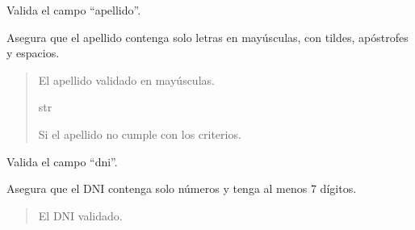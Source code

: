 \documentclass[letterpaper,10pt,spanish]{sphinxmanual}
\begin{document}
\begin{fulllineitems}
\begin{fulllineitems}
\pysigstartsignatures
{}
\pysigstopsignatures
\end{fulllineitems}



\begin{fulllineitems}

\pysigstartsignatures
{}
\pysigstopsignatures
\sphinxAtStartPar
Valida el campo “apellido”.

\sphinxAtStartPar
Asegura que el apellido contenga solo letras en mayúsculas, con
tildes, apóstrofes y espacios.
\begin{quote}\begin{description}
\sphinxAtStartPar
El apellido validado en mayúsculas.

\sphinxAtStartPar
str

\sphinxAtStartPar
{} \textendash{} Si el apellido no cumple con los criterios.

\end{description}\end{quote}

\end{fulllineitems}



\begin{fulllineitems}

\pysigstartsignatures
{}
\pysigstopsignatures
\sphinxAtStartPar
Valida el campo “dni”.

\sphinxAtStartPar
Asegura que el DNI contenga solo números y tenga al menos 7 dígitos.
\begin{quote}\begin{description}
\sphinxAtStartPar
El DNI validado.


\end{description}
\end{quote}
\end{fulllineitems}
\end{fulllineitems}
\end{document}
